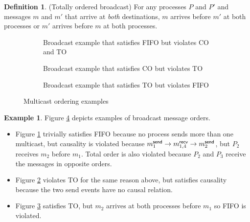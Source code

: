 \documentclass[]             %
{NASA}                       %
\theoremstyle{definition}
\newtheorem{example}{Example}[section]
\newtheorem{definition}{Definition}[section]
\providecommand{\tightlist}{%
  \setlength{\itemsep}{0pt}\setlength{\parskip}{0pt}}
\begin{document}
\begin{definition}(Totally ordered broadcast)
  \label{def:totalorderbroadcast} For any processes $P$ and $P'$ and
  messages $m$ and $m'$ that arrive at \emph{both} destinations, $m$
  arrives before $m'$ at both processes or $m'$ arrives before $m$ at
  both processes.
\end{definition}

\begin{figure}[p]
  \setlength\belowcaptionskip{5ex}
  \begin{subfigure}{1\textwidth}
    \centering
    
    \caption{Broadcast example that satisfies FIFO but violates CO and TO}
    \label{fig:bcast-order-examples-1}
  \end{subfigure}
  \begin{subfigure}{1\textwidth}
    \centering
    
    \caption{Broadcast example that satisfies CO but violates TO}
    \label{fig:bcast-order-examples-2}
  \end{subfigure}
  \begin{subfigure}{1\textwidth}
    \centering
    
    \caption{Broadcast example that satisfies TO but violates FIFO}
    \label{fig:bcast-order-examples-3}
  \end{subfigure}
  \caption{Multicast ordering examples}
  \label{fig:bcast-ordering-examples}
\end{figure}

\begin{example}
Figure \ref{fig:bcast-ordering-examples} depicts examples of broadcast
message orders.
\begin{itemize}
  \tightlist
\item Figure \ref{fig:bcast-order-examples-1} trivially satisfies FIFO
  because no process sends more than one multicast, but causality is
  violated because $m_{1}^{\mathsf{send}} \to m_{1,4}^{\mathsf{recv}} \to m_{2}^{\mathsf{send}}$, but
  $P_2$ receives $m_2$ before $m_1$. Total order is also violated
  because $P_2$ and $P_3$ receive the messages in opposite orders.
\item Figure \ref{fig:bcast-order-examples-2} violates TO for the same
  reason above, but satisfies causality because the two send events
  have no causal relation.
\item Figure \ref{fig:bcast-order-examples-3}
  satisfies TO, but $m_2$ arrives at both processes before $m_1$ so
  FIFO is violated.
\end{itemize}
\end{example}
\end{document}
